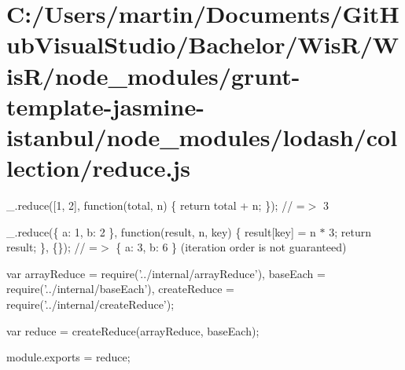 \hypertarget{_c_1_2_users_2martin_2_documents_2_git_hub_visual_studio_2_bachelor_2_wis_r_2_wis_r_2node_moduleff50cf32c39f2ce61370996fadae1537}{}\section{C\+:/\+Users/martin/\+Documents/\+Git\+Hub\+Visual\+Studio/\+Bachelor/\+Wis\+R/\+Wis\+R/node\+\_\+modules/grunt-\/template-\/jasmine-\/istanbul/node\+\_\+modules/lodash/collection/reduce.\+js}
\+\_\+.\+reduce(\mbox{[}1, 2\mbox{]}, function(total, n) \{ return total + n; \}); // =$>$ 3

\+\_\+.\+reduce(\{ \textquotesingle{}a\textquotesingle{}\+: 1, \textquotesingle{}b\textquotesingle{}\+: 2 \}, function(result, n, key) \{ result\mbox{[}key\mbox{]} = n $\ast$ 3; return result; \}, \{\}); // =$>$ \{ \textquotesingle{}a\textquotesingle{}\+: 3, \textquotesingle{}b\textquotesingle{}\+: 6 \} (iteration order is not guaranteed)


\begin{DoxyCodeInclude}
var arrayReduce = require(\textcolor{stringliteral}{'../internal/arrayReduce'}),
    baseEach = require(\textcolor{stringliteral}{'../internal/baseEach'}),
    createReduce = require(\textcolor{stringliteral}{'../internal/createReduce'});

var reduce = createReduce(arrayReduce, baseEach);

module.exports = reduce;
\end{DoxyCodeInclude}
 